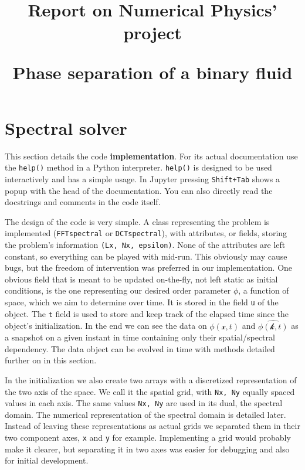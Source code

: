\documentclass[a4paper]{article}
\begin{document}
\title{Report on Numerical Physics' project

\bf{Phase separation of a binary fluid}
}
\maketitle
\pagebreak

\tableofcontents
\pagebreak


\section{Spectral solver}
This section details the code {\bf implementation}.
For its actual documentation use the \verb`help()` method in a Python interpreter. 
\verb`help()` is designed to be used interactively and has a simple usage.
In Jupyter pressing \verb`Shift+Tab` shows a popup with the head of the documentation.
You can also directly read the docstrings and comments in the code itself.

The design of the code is very simple.
A class representing the problem is implemented (\verb`FFTspectral` or \verb`DCTspectral`),
with attributes, or fields, storing the problem's information \verb`(Lx, Nx, epsilon)`.
None of the attributes are left constant, so everything can be played with mid-run.
This obviously may cause bugs, but the freedom of intervention was preferred in our implementation.
One obvious field that is meant to be updated on-the-fly,
not left static as initial conditions,
is the one representing our desired order parameter $\phi$,
a function of space,
which we aim to determine over time.
It is stored in the field \verb`u` of the object.
The \verb`t` field is used to store and keep track of the elapsed time since the object's initialization.
In the end we can see the data on
$\phi(\mathcal{x}, t)$
and
$\hat{\phi(\mathcal{k}, t)}$
as a snapshot on a given instant in time containing only their spatial/spectral dependency.
The data object can be evolved in time with methods detailed further on in this section.

In the initialization we also create two arrays with a discretized representation of the two axis of the space.
We call it the spatial grid, with \verb`Nx, Ny` equally spaced values in each axis.
The same values \verb`Nx, Ny` are used in its dual, the spectral domain.
The numerical representation of the spectral domain is detailed later.
Instead of leaving these representations as actual grids we separated them in their two component axes, \verb`x` and \verb`y` for example.
Implementing a grid would probably make it clearer, but separating it in two axes was easier for debugging and also for initial development.
\end{document}
